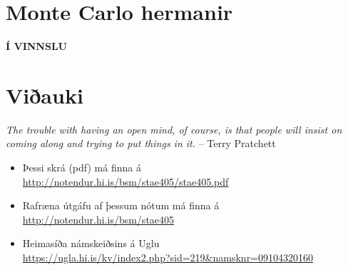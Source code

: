 \documentclass[A4paper,10pt,icelandic]{sphinxmanual}
\begin{document}
% 
% 
% 
% 
% 
% 
% 
 \chapter{Monte Carlo hermanir}


\textbf{Í VINNSLU}


\chapter{Viðauki}
\label{vidauki::doc}\label{vidauki:viauki}
\emph{The trouble with having an open mind, of course, is that people will insist on coming along and trying to put things in it.}
-- Terry Pratchett

\begin{itemize}

\item Þessi skrá (pdf) má finna á \\ \url{http://notendur.hi.is/bsm/stae405/stae405.pdf}

\item Rafræna útgáfu af þessum nótum má finna á \\ \url{http://notendur.hi.is/bsm/stae405}

\item Heimasíða námskeiðsins á Uglu \\ \url{https://ugla.hi.is/kv/index2.php?sid=219&namsknr=09104320160}

\end{itemize}
\end{document}
